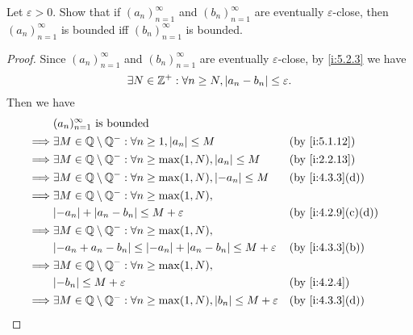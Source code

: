 \begin{ex}\label{i:ex:5.2.2}
  Let \(\varepsilon > 0\).
  Show that if \((a_n)_{n = 1}^{\infty}\) and \((b_n)_{n = 1}^{\infty}\) are eventually \(\varepsilon\)-close, then \((a_n)_{n = 1}^{\infty}\) is bounded iff \((b_n)_{n = 1}^{\infty}\) is bounded.
\end{ex}

\begin{proof}
  Since \((a_n)_{n = 1}^{\infty}\) and \((b_n)_{n = 1}^{\infty}\) are eventually \(\varepsilon\)-close, by \cref{i:5.2.3} we have
  \[
    \exists N \in \mathbb{Z}^+ : \forall n \geq N, \left\lvert a_n - b_n\right\rvert \leq \varepsilon.
  \]
  Then we have
  \begin{align*}
             & (a_n)_{n = 1}^\infty \text{ is bounded}                                                                            \\
    \implies & \exists M \in \Q \setminus \Q^- : \forall n \geq 1, \abs{a_n} \leq M                        &  & \by{i:5.1.12}     \\
    \implies & \exists M \in \Q \setminus \Q^- : \forall n \geq \max(1, N), \abs{a_n} \leq M               &  & \by{i:2.2.13}     \\
    \implies & \exists M \in \Q \setminus \Q^- : \forall n \geq \max(1, N), \abs{-a_n} \leq M              &  & \by{i:4.3.3}[d]   \\
    \implies & \exists M \in \Q \setminus \Q^- : \forall n \geq \max(1, N),                                                       \\
             & \abs{-a_n} + \abs{a_n - b_n} \leq M + \varepsilon                                           &  & \by{i:4.2.9}[c,d] \\
    \implies & \exists M \in \Q \setminus \Q^- : \forall n \geq \max(1, N),                                                       \\
             & \abs{-a_n + a_n - b_n} \leq \abs{-a_n} + \abs{a_n - b_n} \leq M + \varepsilon               &  & \by{i:4.3.3}[b]   \\
    \implies & \exists M \in \Q \setminus \Q^- : \forall n \geq \max(1, N),                                                       \\
             & \abs{-b_n} \leq M + \varepsilon                                                             &  & \by{i:4.2.4}      \\
    \implies & \exists M \in \Q \setminus \Q^- : \forall n \geq \max(1, N), \abs{b_n} \leq M + \varepsilon &  & \by{i:4.3.3}[d]   \\

\end{align*}
\end{proof}
